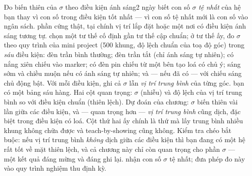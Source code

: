 \documentclass[../../marker.tex]{subfiles}
\begin{document}
\begin{duan}{Đo biến thiên của \(\sigma\) theo điều kiện ánh sáng}{2 ngày}
\dmt biết con số \(\sigma\) \emph{tệ nhất} của hệ bạn thay vì con số trong điều kiện tốt nhất --- vì con số tệ nhất mới là con số vào ngân sách.
\ddl phần cứng thật, tại chính vị trí lắp đặt hoặc một nơi có điều kiện ánh sáng tương tự.
\dbc chọn một tư thế cố định gần tư thế cập chuẩn; ở tư thế ấy, đo \(\sigma\) theo quy trình của  mini project (500 khung, độ lệch chuẩn của toạ độ góc) trong \emph{sáu} điều kiện: đèn trần bình thường; đèn trần tắt (chỉ ánh sáng tự nhiên); có nắng xiên chiếu vào marker; có đèn pin chiếu từ một bên tạo loá có chủ ý; sáng sớm và chiều muộn nếu có ánh sáng tự nhiên; và --- nếu đã có --- với chiếu sáng chủ động bật. Với mỗi điều kiện, ghi cả \(\sigma\) lẫn \emph{vị trí trung bình} của từng góc.
\dxk bạn có một bảng sáu hàng. Hai cột quan trọng: \(\sigma\) (nhiễu) và độ lệch của vị trí trung bình so với điều kiện chuẩn (thiên lệch). Dự đoán của chương: \(\sigma\) biến thiên vài lần giữa các điều kiện, và --- quan trọng hơn --- \emph{vị trí trung bình} cũng dịch, đặc biệt trong điều kiện có loá. Cột thứ hai ấy chính là thứ mà lấy trung bình nhiều khung không chữa được và teach-by-showing cũng không. Kiểm tra chéo bắt buộc: nếu vị trí trung bình \emph{không} dịch giữa các điều kiện thì bạn đang có một hệ rất tốt về mặt thiên lệch, và cả chương này chỉ còn quan trọng cho phần \(\sigma\) --- một kết quả đáng mừng và đáng ghi lại.
\dnv {} nhận con số \(\sigma\) tệ nhất;  đưa phép đo này vào quy trình nghiệm thu định kỳ.
\end{duan}
\end{document}

